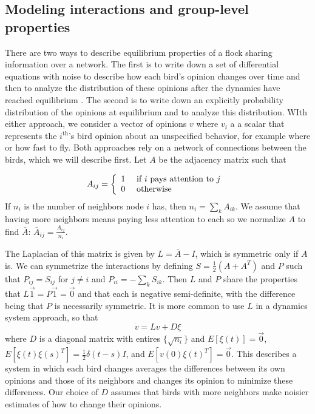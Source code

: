 \documentclass{article}
\begin{document}
\subsection{Modeling interactions and group-level properties }
There are two ways to describe equilibrium properties of a flock sharing information over a network.  The first is to write down a set of differential equations with noise to describe how each bird's opinion changes over time and then to analyze the distribution of these opinions after the dynamics have reached equilibrium \cite{Young:2010fk,Young:2013kx}. The second is to write down an explicitly probability distribution of the opinions at equilibrium and to analyze this distribution. WIth either approach, we consider a vector of opinions $v$ where $v_i$ a a scalar that represents the $i^\text{th}$'s bird opinion about an unspecified behavior, for example where or how fast to fly. Both approaches rely on a network of connections between the birds, which we will describe first. Let $A$ be the adjacency matrix such that 

\begin{equation}
A_{ij}=\left\{\begin{array}{l l l}
1 & \text{ if $i$ pays attention to $j$ }
\\0 & \text{ otherwise }
\end{array}\right.
\end{equation}
If $n_i$ is the number of neighbors node $i$ has, then $n_i=\sum_kA_{ik}$. We assume that having more neighbors means paying less attention to each so we normalize $A$ to find $\bar{A}$: $\bar{A}_{ij}=\frac{A_{ij}}{n_i}$.


The Laplacian of this matrix is given by $L=\bar{A}-I$, which is symmetric only if $A$ is.  We can symmetrize the interactions by defining $S=\frac{1}{2}(A+A^T)$ and $P$ such that $P_{ij}=S_{ij}$ for $j\neq i$ and $P_{ii}=-\sum_kS_{ik}$. Then $L$ and $P$ share the properties that $L\vec{1}=P\vec{1}=\vec{0}$ and that each is negative semi-definite, with the difference being that $P$ is necessarily symmetric.  It is more common to use $L$ in a dynamics system approach, so that 
\begin{equation}
\dot{v}=Lv+D\xi \label{opinion_dynamics}
\end{equation} 
where $D$ is a diagonal matrix with entires $\{\sqrt{n_i}\}$ and $E[\xi(t)]=\vec{0}$, $E[\xi(t)\xi(s)^T]=\frac{1}{2}\delta(t-s)I$, and $E[v(0)\xi(t)^T]=\vec{0}$. This describes a system in which each bird changes averages the differences between its own opinions and those of its neighbors and changes its opinion to minimize these differences. Our choice of $D$ assumes that birds with more neighbors make noisier estimates of how to change their opinions. 
\end{document}
